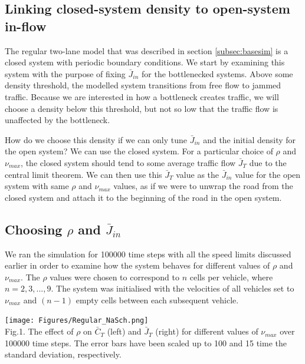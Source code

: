 \documentclass[11pt]{article}
\begin{document}
	\subsection{Linking closed-system density to open-system in-flow}\label{subsec:closeopen}
	
	The regular two-lane model that was described in section \ref{subsec:basesim} is a closed system with periodic boundary conditions. We start by examining this system with the purpose of fixing $\bar{J}_{in}$ for the bottlenecked systems. Above some density threshold, the modelled system transitions from free flow to jammed traffic\cite{LubeckSchreckPhase}. Because we are interested in how a bottleneck creates traffic, we will choose a density below this threshold, but not so low that the traffic flow is unaffected by the bottleneck.
	
	How do we choose this density if we can only tune $\bar{J}_{in}$ and the initial density for the open system? We can use the closed system. For a particular choice of $\rho$ and $\nu_{max}$, the closed system should tend to some average traffic flow $\bar{J}_T$ due to the central limit theorem. We can then use this $\bar{J}_T$ value as the $\bar{J}_{in}$ value for the open system with same $\rho$ and $\nu_{max}$ values, as if we were to unwrap the road from the closed system and attach it to the beginning of the road in the open system.\\
	
	\subsection{Choosing $\rho$ and $\bar{J}_{in}$}\label{subsec:regdensity}
	
	We ran the simulation for 100000 time steps with all the speed limits discussed earlier in order to examine how the system behaves for different values of $\rho$ and $\nu_{max}$. The $\rho$ values were chosen to correspond to $n$ cells per vehicle, where $n = 2, 3, ..., 9$. The system was initialised with the velocities of all vehicles set to $\nu_{max}$ and $(n-1)$ empty cells between each subsequent vehicle.\\
	
	\begin{center}
		\texttt{[image: Figures/Regular\_NaSch.png]}\\
		Fig.1.	
		The effect of $\rho$ on $\bar{C}_T$ (left) and $\bar{J}_T$ (right) for different values of $\nu_{max}$ over 100000 time steps. The error bars have been scaled up to 100 and 15 time the standard deviation, respectively.\\
	\end{center}
\end{document}
